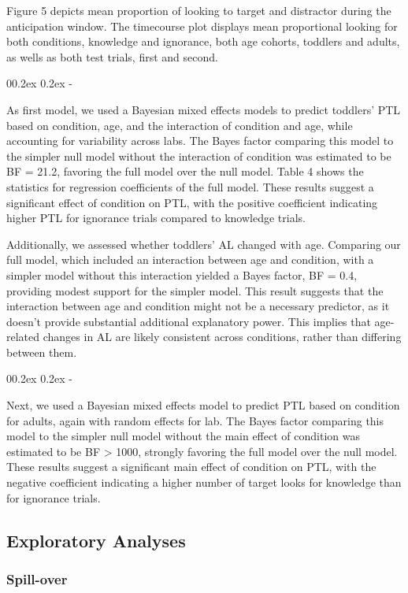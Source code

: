 \documentclass[
  man,floatsintext]{apa6}
\makeatletter
\let\oldsubparagraph\subparagraph
\renewcommand{\subparagraph}{
    \@ifstar
      \xxxSubParagraphStar
      \xxxSubParagraphNoStar
  }
\newcommand{\xxxSubParagraphStar}[1]{\oldsubparagraph*{#1}\mbox{}}
\newcommand{\xxxSubParagraphNoStar}[1]{\oldsubparagraph{#1}\mbox{}}
\renewcommand{\subparagraph}[1]{\@startsection{subparagraph}{5}{1em}%
  {0\baselineskip \@plus 0.2ex \@minus 0.2ex}%
  {-\z@\relax}%
  {\normalfont\normalsize\itshape\hspace{\parindent}{#1}\textit{\addperi}}{\relax}}
\makeatother
\begin{document}
Figure 5 depicts mean proportion of looking to target and distractor during the anticipation window. The timecourse plot displays mean proportional looking for both conditions, knowledge and ignorance, both age cohorts, toddlers and adults, as wells as both test trials, first and second.

\subparagraph{Toddlers}\label{toddlers-3}

As first model, we used a Bayesian mixed effects models to predict toddlers' PTL based on condition, age, and the interaction of condition and age, while accounting for variability across labs. The Bayes factor comparing this model to the simpler null model without the interaction of condition was estimated to be BF = 21.2, favoring the full model over the null model. Table 4 shows the statistics for regression coefficients of the full model. These results suggest a significant effect of condition on PTL, with the positive coefficient indicating higher PTL for ignorance trials compared to knowledge trials.

Additionally, we assessed whether toddlers' AL changed with age. Comparing our full model, which included an interaction between age and condition, with a simpler model without this interaction yielded a Bayes factor, BF = 0.4, providing modest support for the simpler model. This result suggests that the interaction between age and condition might not be a necessary predictor, as it doesn't provide substantial additional explanatory power. This implies that age-related changes in AL are likely consistent across conditions, rather than differing between them.

\subparagraph{Adults}\label{adults-3}

Next, we used a Bayesian mixed effects model to predict PTL based on condition for adults, again with random effects for lab. The Bayes factor comparing this model to the simpler null model without the main effect of condition was estimated to be BF \textgreater{} 1000, strongly favoring the full model over the null model. These results suggest a significant main effect of condition on PTL, with the negative coefficient indicating a higher number of target looks for knowledge than for ignorance trials.

\subsection{Exploratory Analyses}\label{exploratory-analyses}

\subsubsection{Spill-over}\label{spill-over}
\end{document}
